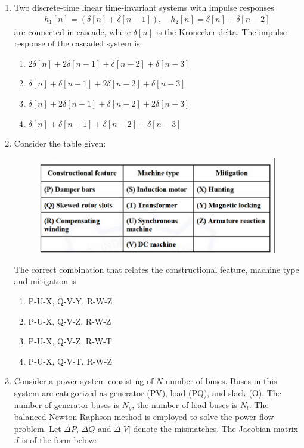 \documentclass[journal,12pt,onecolumn]{IEEEtran}
\theoremstyle{remark}
\begin{document}
\begin{flushleft}
\begin{enumerate}
\item Two discrete-time linear time-invariant systems with impulse responses  
\begin{align*}
    h_1[n] = ( \delta[n] + \delta[n-1] ), \quad h_2[n] = \delta[n] + \delta[n-2]
\end{align*}
are connected in cascade, where $\delta[n]$ is the Kronecker delta. The impulse response of the cascaded system is

\begin{enumerate}
\item $2\delta[n] + 2\delta[n-1] + \delta[n-2] + \delta[n-3]$
\item $\delta[n] + \delta[n-1] + 2\delta[n-2] + \delta[n-3]$
\item $\delta[n] + 2\delta[n-1] + \delta[n-2] + 2\delta[n-3]$
\item $\delta[n] + \delta[n-1] + \delta[n-2] + \delta[n-3]$
\end{enumerate}


\item Consider the table given:  

\begin{figure}[H]
    \centering
    \includegraphics[width=0.5\columnwidth]{figs/8.png}
    \caption{}
    \label{fig:placeholder}
\end{figure}

The correct combination that relates the constructional feature, machine type and mitigation is

\begin{enumerate}
\item P-U-X, Q-V-Y, R-W-Z
\item P-U-X, Q-V-Z, R-W-Z
\item P-U-X, Q-V-Z, R-W-T
\item P-U-X, Q-V-T, R-W-Z
\end{enumerate}

\item Consider a power system consisting of $N$ number of buses. Buses in this system are categorized as generator (PV), load (PQ), and slack (O). The number of generator buses is $N_g$, the number of load buses is $N_l$. The balanced Newton-Raphson method is employed to solve the power flow problem. Let $\Delta P$, $\Delta Q$ and $\Delta |V|$ denote the mismatches. The Jacobian matrix $J$ is of the form below:


\end{enumerate}
\end{flushleft}
\end{document}
